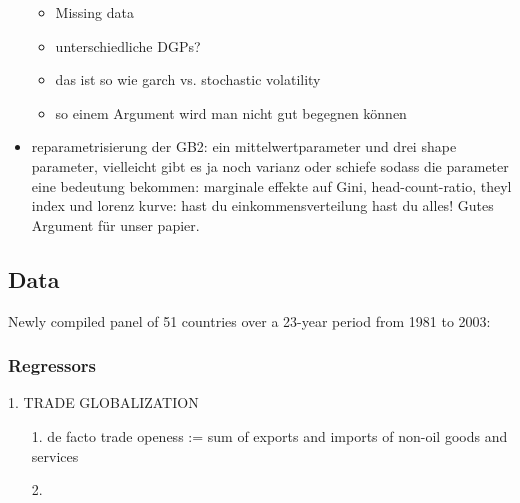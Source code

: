 \begin{itemize}
\begin{itemize}
\item Missing data
\item unterschiedliche DGPs?
\item das ist so wie garch vs. stochastic volatility
\item so einem Argument wird man nicht gut begegnen können
\end{itemize}
\item reparametrisierung der GB2: ein mittelwertparameter und drei shape parameter, vielleicht gibt es ja noch varianz oder schiefe sodass die parameter eine bedeutung bekommen: marginale effekte auf Gini, head-count-ratio, theyl index und lorenz kurve: hast du einkommensverteilung hast du alles! Gutes Argument für unser papier.
\end{itemize}
\subsection*{Data}
Newly compiled panel of 51 countries over a 23-year period from 1981 to 2003:
\subsubsection*{Regressors}
1. TRADE GLOBALIZATION
\begin{itemize}
\item[1.] de facto trade openess := sum of exports and imports of non-oil goods and services
\item[2.] 
\end{itemize}

